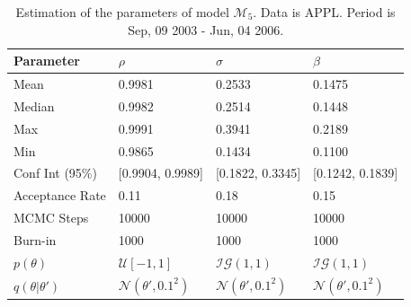 \documentclass[11pt,a4,twosided,singlespacing,titlepagenumber=on]{scrreprt}
\numberwithin{equation}{chapter} %
\theoremstyle{remark}
\begin{document}
\begin{table}[H]
\centering
\begin{tabular}{llll}
Parameter      	& $\rho$ & $\sigma$ & $\beta$ \\ 
\hline
Mean            & 0.9981              & 0.2533             & 0.1475\\
Median          & 0.9982              & 0.2514             & 0.1448\\
Max             & 0.9991              & 0.3941             & 0.2189\\
Min             & 0.9865              & 0.1434             & 0.1100\\
Conf Int (95\%) & [0.9904, 0.9989]    & [0.1822, 0.3345]   & [0.1242, 0.1839]\\
Acceptance Rate & 0.11                & 0.18               & 0.15 \\
MCMC Steps      & 10000               & 10000              & 10000 \\
Burn-in         & 1000                & 1000               & 1000 \\
$p(\theta)$     & $\mathcal{U}[-1,1]$   & $\mathcal{IG}(1,1)$  & $\mathcal{IG}(1,1)$     \\
$q(\theta|\theta')$& $\mathcal{N}(\theta', 0.1^2)$ & $\mathcal{N}(\theta', 0.1^2)$ & $\mathcal{N}(\theta', 0.1^2)$     \\
\hline
\end{tabular}
\caption{Estimation of the parameters of model $\mathcal{M}_5$. Data is APPL. Period is Sep, 09 2003 - Jun,
04 2006.}
\label{est_appl_params}
\end{table}
\end{document}
